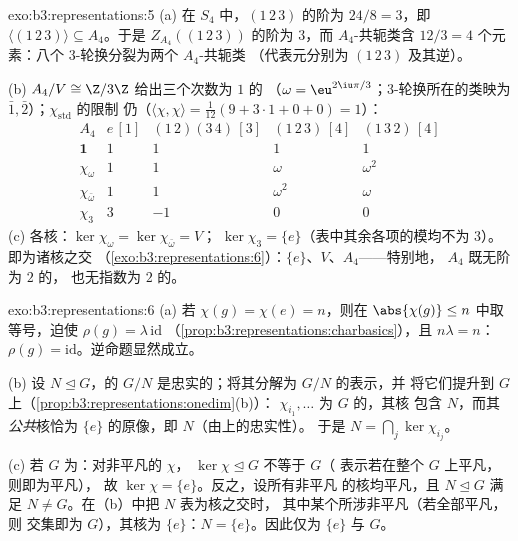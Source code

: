 \begin{solution}{exo:b3:representations:5}
(a) 在 $S_4$ 中，$(1\,2\,3)$ 的阶为 $24/8 =
3$，即 $\langle(1\,2\,3)\rangle \subseteq A_4$。于是
$Z_{A_4}((1\,2\,3))$ 的阶为 $3$，而 $A_4$-共轭类含 $12/3
= 4$ 个元素：八个 $3$-轮换分裂为两个 $A_4$-共轭类
（代表元分别为 $(1\,2\,3)$ 及其逆）。

(b) $A_4/V \cong \Z/3\Z$ 给出三个次数为 $1$ 的
（$\omega = \eu^{2\iu\pi/3}$；$3$-轮换所在的类映为
$\bar1, \bar2$）；$\chi_{\mathrm{std}}$ 的限制
仍（$\langle\chi,\chi\rangle = \frac1{12}(9 + 3
\cdot 1 + 0 + 0) = 1$）：
\[
\begin{array}{c|cccc}
A_4 & e\,[1] & (1\,2)(3\,4)\,[3] & (1\,2\,3)\,[4] &
(1\,3\,2)\,[4]\\
\hline
\mathbf 1 & 1 & 1 & 1 & 1\\
\chi_\omega & 1 & 1 & \omega & \omega^2\\
\chi_{\bar\omega} & 1 & 1 & \omega^2 & \omega\\
\chi_3 & 3 & -1 & 0 & 0
\end{array}
\]
(c) 各核：$\ker\chi_\omega = \ker\chi_{\bar\omega} = V$；
$\ker\chi_3 = \{e\}$（表中其余各项的模均不为 $3$）。
即为诸核之交
（\cref{exo:b3:representations:6}）：$\{e\}$、$V$、$A_4$——特别地，
$A_4$ 既无阶为 $2$ 的，
也无指数为 $2$ 的。
\end{solution}

\begin{solution}{exo:b3:representations:6}
(a) 若 $\chi(g) = \chi(e) = n$，则在
$\abs{\chi(g)} \leq n$ 中取等号，迫使 $\rho(g) = \lambda\,\mathrm{id}$
（\cref{prop:b3:representations:charbasics}），且 $n\lambda = n$：
$\rho(g) = \mathrm{id}$。逆命题显然成立。

(b) 设 $N \trianglelefteq G$，的
$G/N$ 是忠实的；将其分解为 $G/N$ 的表示，并
将它们提升到 $G$ 上（\cref{prop:b3:representations:onedim}(b)）：
$\chi_{i_1}, \dots$ 为 $G$ 的，其核
包含 $N$，而其\emph{公共}核恰为
$\{e\}$ 的原像，即 $N$（由上的忠实性）。
于是 $N = \bigcap_j \ker\chi_{i_j}$。

(c) 若 $G$ 为：对非平凡的 $\chi$，
$\ker\chi \trianglelefteq G$ 不等于 $G$（
表示若在整个 $G$ 上平凡，则即为平凡），
故 $\ker\chi = \{e\}$。反之，设所有非平凡
的核均平凡，且 $N \trianglelefteq G$ 满足 $N \neq
G$。在（b）中把 $N$ 表为核之交时，
其中某个所涉非平凡（若全部平凡，则
交集即为 $G$），其核为 $\{e\}$：$N =
\{e\}$。因此仅为 $\{e\}$ 与 $G$。
\end{solution}

